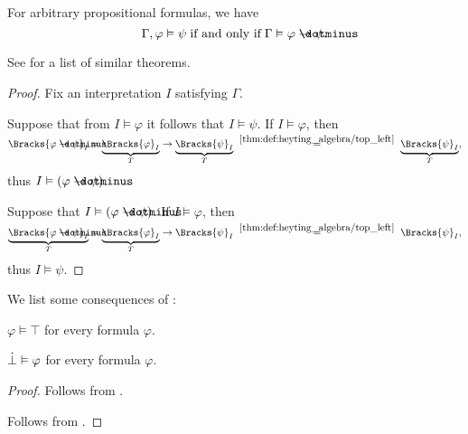 \begin{theorem}\label{thm:propositional_semantic_deduction_theorem}
  For arbitrary propositional formulas, we have
  \begin{equation*}
    \Gamma, \varphi \vDash \psi \T{if and only if} \Gamma \vDash \varphi \synimplies \psi.
  \end{equation*}
\end{theorem}
\begin{comments}
  \item See  for a list of similar theorems.
\end{comments}
\begin{proof}
  Fix an interpretation \( I \) satisfying \( \Gamma \).

  \SufficiencySubProof Suppose that from \( I \vDash \varphi \) it follows that \( I \vDash \psi \). If \( I \vDash \varphi \), then
  \begin{equation*}
    \Bracks{\varphi \synimplies \psi}_I
    =
    \underbrace{\Bracks{\varphi}_I}_T \rightarrow \underbrace{\Bracks{\psi}_I}_T
    \reloset {\ref{thm:def:heyting_algebra/top_left}} =
    \underbrace{\Bracks{\psi}_I}_T,
  \end{equation*}
  thus \( I \vDash (\varphi \synimplies \psi) \).

  \NecessitySubProof Suppose that \( I \vDash (\varphi \synimplies \psi) \). If \( I \vDash \varphi \), then
  \begin{equation*}
    \underbrace{\Bracks{\varphi \synimplies \psi}_I}_{T}
    =
    \underbrace{\Bracks{\varphi}_I}_T \rightarrow \Bracks{\psi}_I
    \reloset {\ref{thm:def:heyting_algebra/top_left}} =
    \Bracks{\psi}_I,
  \end{equation*}
  thus \( I \vDash \psi \).
\end{proof}

\begin{corollary}\label{thm:intuitionistic_deduction_consequences}
  We list some consequences of :
  \begin{thmenum}
     \( \varphi \vDash \top \) for every formula \( \varphi \).

     \( \dot\bot \vDash \varphi \) for every formula \( \varphi \).
  \end{thmenum}
\end{corollary}
\begin{proof}
   Follows from .

   Follows from .
\end{proof}

